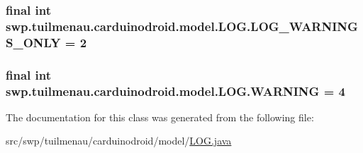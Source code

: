 \subsubsection[{L\+O\+G\+\_\+\+W\+A\+R\+N\+I\+N\+G\+S\+\_\+\+O\+N\+L\+Y}]{\setlength{\rightskip}{0pt plus 5cm}final int swp.\+tuilmenau.\+carduinodroid.\+model.\+L\+O\+G.\+L\+O\+G\+\_\+\+W\+A\+R\+N\+I\+N\+G\+S\+\_\+\+O\+N\+L\+Y = 2\hspace{0.3cm}{\ttfamily [static]}}\label{classswp_1_1tuilmenau_1_1carduinodroid_1_1model_1_1_l_o_g_a2c91853552049e345b83f8b33245e18b}
\hypertarget{classswp_1_1tuilmenau_1_1carduinodroid_1_1model_1_1_l_o_g_a98c0b6a797efdb1fce0bc63410ce535d}{}
\subsubsection[{W\+A\+R\+N\+I\+N\+G}]{\setlength{\rightskip}{0pt plus 5cm}final int swp.\+tuilmenau.\+carduinodroid.\+model.\+L\+O\+G.\+W\+A\+R\+N\+I\+N\+G = 4\hspace{0.3cm}{\ttfamily [static]}}\label{classswp_1_1tuilmenau_1_1carduinodroid_1_1model_1_1_l_o_g_a98c0b6a797efdb1fce0bc63410ce535d}


The documentation for this class was generated from the following file\+:\begin{DoxyCompactItemize}
\item 
src/swp/tuilmenau/carduinodroid/model/\hyperlink{_l_o_g_8java}{L\+O\+G.\+java}\end{DoxyCompactItemize}
